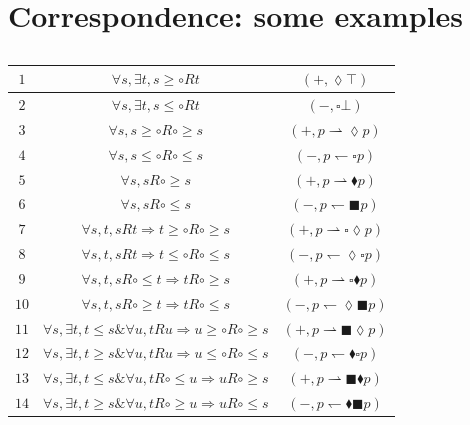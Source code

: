 \documentclass[draft]{article}
\begin{document}
\section{Correspondence: some examples}\label{section:miscellaneous}
%
%
\begin{table}[ht]
%
%
\begin{center}
%
%
\begin{tabular}{|c|c|c|}
%
%
\hline
%
%
%
%
%
%
%
%
$1$&$\forall s,\exists t,s{\geq}{\circ}{R}t$&$(+,{\lozenge}{\top})$
%
%
\\
%
%
\hline
%
%
$2$&$\forall s,\exists t,s{\leq}{\circ}{R}t$&$(-,{\square}{\bot})$
%
%
\\
%
%
\hline
%
%
$3$&$\forall s,s{\geq}{\circ}{R}{\circ}{\geq}s$&$(+,p{\rightharpoonup}{\lozenge}p)$
%
%
\\
%
%
\hline
%
%
$4$&$\forall s,s{\leq}{\circ}{R}{\circ}{\leq}s$&$(-,p{\leftharpoondown}{\square}p)$
%
%
\\
%
%
\hline
%
%
$5$&$\forall s,s{R}{\circ}{\geq}s$&$(+,p{\rightharpoonup}{\blacklozenge}p)$
%
%
\\
%
%
\hline
%
%
$6$&$\forall s,s{R}{\circ}{\leq}s$&$(-,p{\leftharpoondown}{\blacksquare}p)$
%
%
\\
%
%
\hline
%
%
$7$&$\forall s,t,s{R}t\Rightarrow t{\geq}{\circ}{R}{\circ}{\geq}s$&$(+,p{\rightharpoonup}{\square}{\lozenge}p)$
%
%
\\
%
%
\hline
%
%
$8$&$\forall s,t,s{R}t\Rightarrow t{\leq}{\circ}{R}{\circ}{\leq}s$&$(-,p{\leftharpoondown}{\lozenge}{\square}p)$
%
%
\\
%
%
\hline
%
%
$9$&$\forall s,t,s{R}{\circ}{\leq}t\Rightarrow t{R}{\circ}{\geq}s$&$(+,p{\rightharpoonup}{\square}{\blacklozenge}p)$
%
%
\\
%
%
\hline
%
%
$10$&$\forall s,t,s{R}{\circ}{\geq}t\Rightarrow t{R}{\circ}{\leq}s$&$(-,p{\leftharpoondown}{\lozenge}{\blacksquare}p)$
%
%
\\
%
%
\hline
%
%
$11$&$\forall s,\exists t,t{\leq}s\&\forall u,t{R}u\Rightarrow u{\geq}{\circ}{R}{\circ}{\geq}s$&$(+,p{\rightharpoonup}{\blacksquare}{\lozenge}p)$
%
%
\\
%
%
\hline
%
%
$12$&$\forall s,\exists t,t{\geq}s\&\forall u,t{R}u\Rightarrow u{\leq}{\circ}{R}{\circ}{\leq}s$&$(-,p{\leftharpoondown}{\blacklozenge}{\square}p)$
%
%
\\
%
%
\hline
%
%
$13$&$\forall s,\exists t,t{\leq}s\&\forall u,t{R}{\circ}{\leq}u\Rightarrow u{R}{\circ}{\geq}s$&$(+,p{\rightharpoonup}{\blacksquare}{\blacklozenge}p)$
%
%
\\
%
%
\hline
%
%
$14$&$\forall s,\exists t,t{\geq}s\&\forall u,t{R}{\circ}{\geq}u\Rightarrow u{R}{\circ}{\leq}s$&$(-,p{\leftharpoondown}{\blacklozenge}{\blacksquare}p)$
%
%
\\
%
%
\hline
%
%
\end{tabular}
%
%
\vspace{+0.25cm}
%
%
\caption{}\label{table:modal:definability:results:a}
%
%
\end{center}
%
%
\end{table}
%
%
\vspace{-0.50cm}
%
%
%
%
\end{document}
